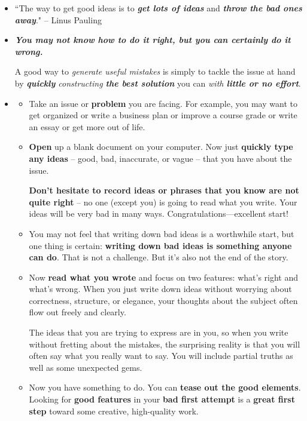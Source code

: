 \documentclass[11pt]{article}
\begin{document}
\begin{itemize}
\item ``The way to get good ideas is to \emph{\textbf{get lots of ideas}} and \emph{\textbf{throw the bad ones away}}." -- Linus Pauling

\item \emph{\textbf{You may not know how to do it right, but you can certainly do it wrong.}} 

A good way to \emph{generate useful mistakes} is simply to tackle the issue at hand by \emph{\textbf{quickly} constructing \textbf{the best solution}} you can \emph{with \textbf{little or no effort}}.

\item \begin{exercise}
\begin{itemize}
\item Take an issue or \textbf{problem} you are facing. For example, you may want to get organized or write a business plan or improve a course grade or write an essay or get more out of life. 

\item \textbf{Open} up a blank document on your computer. Now just \textbf{quickly type any ideas} -- good, bad, inaccurate, or vague -- that you have about the issue. 

\textbf{Don’t hesitate to record ideas or phrases that you know are not quite right} -- no one (except you) is going to read what you write. Your ideas will be very bad in many ways.  Congratulations—excellent start!

\item You may not feel that writing down bad ideas is a worthwhile start, but one thing is certain: \textbf{writing down bad ideas is something anyone can do}.  That is not a challenge. But it’s also not the end of the story.

\item Now \textbf{read what you wrote} and focus on two features: what’s right and what’s wrong. When you just write down ideas without worrying about correctness, structure, or elegance, your thoughts about the subject often flow out freely and clearly. 

The ideas that you are trying to express are in you, so when you write without fretting about the mistakes, the surprising reality is that you will often say what you really want to say. You will include partial truths as well as some unexpected gems.

\item Now you have something to do. You can \textbf{tease out the good elements}.  Looking for \textbf{good features} in your \textbf{bad first attempt} is a \textbf{great first step} toward some creative, high-quality work.


\end{itemize}
\end{exercise}
\end{itemize}
\end{document}
